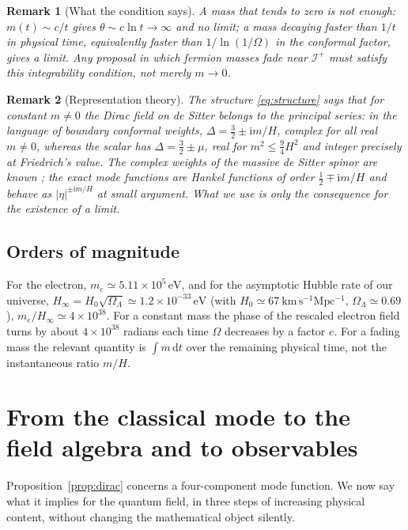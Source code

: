 \documentclass[11pt,a4paper]{article}
\newtheorem{remark}{Remark}
\theoremstyle{definition}
\newcommand{\scri}{\mathscr{I}^{+}}
\newcommand{\dd}{\mathrm{d}}
\newcommand{\ii}{\mathrm{i}}
\begin{document}
\begin{remark}[What the condition says]
A mass that tends to zero is not enough: $m(t)\sim c/t$ gives $\theta\sim c\ln t\to\infty$ and no limit; a mass decaying faster than $1/t$ in physical time, equivalently faster than $1/\ln(1/\Omega)$ in the conformal factor, gives a limit. Any proposal in which fermion masses fade near $\scri$ must satisfy this integrability condition, not merely $m\to0$.
\end{remark}

\begin{remark}[Representation theory]
The structure \eqref{eq:structure} says that for constant $m\ne0$ the Dirac field on de Sitter belongs to the principal series: in the language of boundary conformal weights, $\Delta=\tfrac32\pm\ii m/H$, complex for all real $m\neq0$, whereas the scalar has $\Delta=\tfrac32\pm\mu$, real for $m^{2}\le\tfrac94H^{2}$ and integer precisely at Friedrich's value. The complex weights of the massive de Sitter spinor are known \cite{AllenLutken}; the exact mode functions are Hankel functions of order $\tfrac12\mp\ii m/H$ and behave as $|\eta|^{\pm\ii m/H}$ at small argument. What we use is only the consequence for the existence of a limit.
\end{remark}

\subsection{Orders of magnitude}

For the electron, $m_{e}\simeq5.11\times10^{5}\,\mathrm{eV}$, and for the asymptotic Hubble rate of our universe, $H_{\infty}=H_{0}\sqrt{\Omega_{\Lambda}}\simeq1.2\times10^{-33}\,\mathrm{eV}$ (with $H_{0}\simeq67\ \mathrm{km\,s^{-1}Mpc^{-1}}$, $\Omega_{\Lambda}\simeq0.69$), $m_{e}/H_{\infty}\simeq4\times10^{38}$. For a constant mass the phase of the rescaled electron field turns by about $4\times10^{38}$ radians each time $\Omega$ decreases by a factor $e$. For a fading mass the relevant quantity is $\int m\,\dd t$ over the remaining physical time, not the instantaneous ratio $m/H$.

\section{From the classical mode to the field algebra and to observables}
\label{sec:levels}

Proposition~\ref{prop:dirac} concerns a four-component mode function. We now say what it implies for the quantum field, in three steps of increasing physical content, without changing the mathematical object silently.
\end{document}
